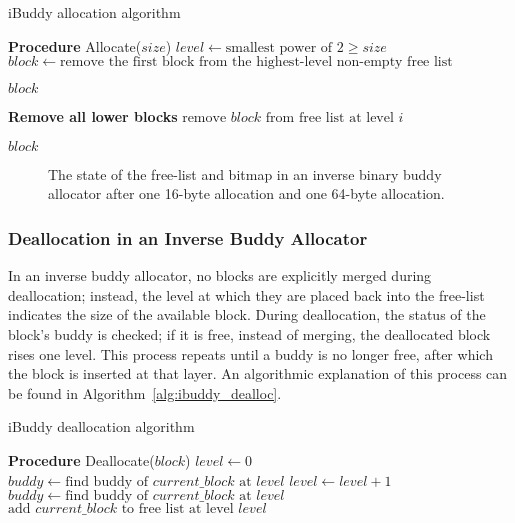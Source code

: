 \begin{algorithm}[h]
  \caption{iBuddy allocation algorithm}
  \label{alg:ibuddy_alloc}
  \begin{algorithmic}[1]
    \Statex \textbf{Procedure} Allocate($size$)
    \State $level \gets \text{smallest power of 2} \geq size$
    \State $block \gets \text{remove the first block from the highest-level non-empty free list}$

    \State \Return $block$
    \State \Return {}
    \EndIf

    \Statex \textbf{Remove all lower blocks}
    \State $\text{remove } block \text{ from free list at level } i$
    \EndFor
    \EndFor

    \State \Return $block$
  \end{algorithmic}
\end{algorithm}

\begin{figure}[h]
  \centering
  
  \caption{The state of the free-list and bitmap in an inverse binary buddy allocator after one 16-byte allocation and one 64-byte allocation.}
  \label{fig:ibuddyallocated2}
\end{figure}
    
\FloatBarrier
\subsubsection{Deallocation in an Inverse Buddy Allocator}
In an inverse buddy allocator, no blocks are explicitly merged during deallocation; instead, the level at which they are placed back into the free-list indicates the size of the available block. During deallocation, the status of the block's buddy is checked; if it is free, instead of merging, the deallocated block rises one level. This process repeats until a buddy is no longer free, after which the block is inserted at that layer. An algorithmic explanation of this process can be found in Algorithm~\ref{alg:ibuddy_dealloc}.

\newpage
\begin{algorithm}[H]
  \caption{iBuddy deallocation algorithm}
  \label{alg:ibuddy_dealloc}
  \begin{algorithmic}[1]
    \Statex \textbf{Procedure} Deallocate($block$)
    \State $level \gets 0$
    \State $buddy \gets \text{find buddy of } current\_block \text{ at } level$
    \State $level \gets level + 1$
    \State $buddy \gets \text{find buddy of } current\_block \text{ at } level$
    \EndWhile
    \State $\text{add } current\_block \text{ to free list at level } level$
    \EndFor

  \end{algorithmic}
\end{algorithm}

